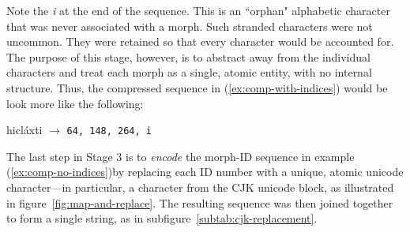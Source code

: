 Note the \textit{i} at the end of the sequence. This is an ``orphan" alphabetic character that was never associated with a morph. Such stranded characters were not uncommon. They were retained so that every character would be accounted for.
The purpose of this stage, however, is to abstract away from the individual characters and treat each morph
as a single, atomic entity, with no internal structure.
Thus, the compressed sequence in (\ref{ex:comp-with-indices}) would be look more like the following:
\begin{exe} \ex \label{ex:comp-no-indices} 
hicl\'{a}xti \qquad  $\to$ \qquad \texttt{64, 148, 264, i}
\end{exe}
The last step in Stage 3 is to \emph{encode} the morph-ID sequence in example (\ref{ex:comp-no-indices})by replacing each
ID number with a unique, atomic unicode character---in particular, a character 
from the CJK unicode block, as illustrated in figure~\ref{fig:map-and-replace}.
The resulting sequence was then joined together to form a single string, as in 
subfigure~\ref{subtab:cjk-replacement}.



